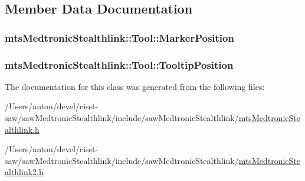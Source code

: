 \subsection{Member Data Documentation}
\hypertarget{classmts_medtronic_stealthlink_1_1_tool_ac1e88de569626cdb66f345ebeffc6228}{}
\subsubsection[{Marker\+Position}]{ mts\+Medtronic\+Stealthlink\+::\+Tool\+::\+Marker\+Position}\label{classmts_medtronic_stealthlink_1_1_tool_ac1e88de569626cdb66f345ebeffc6228}
\hypertarget{classmts_medtronic_stealthlink_1_1_tool_acf9d37a43587bf06a4b596d77feabd9f}{}
\subsubsection[{Tooltip\+Position}]{ mts\+Medtronic\+Stealthlink\+::\+Tool\+::\+Tooltip\+Position}\label{classmts_medtronic_stealthlink_1_1_tool_acf9d37a43587bf06a4b596d77feabd9f}


The documentation for this class was generated from the following files\+:\begin{DoxyCompactItemize}
\item 
/\+Users/anton/devel/cisst-\/saw/saw\+Medtronic\+Stealthlink/include/saw\+Medtronic\+Stealthlink/\hyperlink{mts_medtronic_stealthlink_8h}{mts\+Medtronic\+Stealthlink.\+h}\item 
/\+Users/anton/devel/cisst-\/saw/saw\+Medtronic\+Stealthlink/include/saw\+Medtronic\+Stealthlink/\hyperlink{mts_medtronic_stealthlink2_8h}{mts\+Medtronic\+Stealthlink2.\+h}\end{DoxyCompactItemize}
